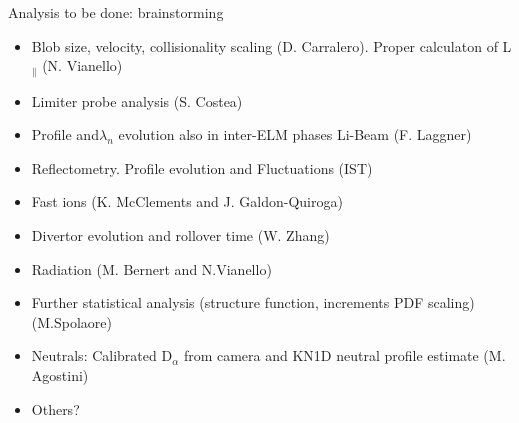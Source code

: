 \documentclass[10pt, compress]{beamer}
\begin{document}
\begin{frame}{Analysis to be done: brainstorming}
  \begin{itemize}
    \item Blob size, velocity, collisionality scaling
      (D. Carralero). Proper calculaton of L$_{\parallel}$ (N. Vianello)
    \item Limiter probe analysis (S. Costea)
    \item Profile and$\lambda_n$ evolution also in inter-ELM phases Li-Beam
      (F. Laggner)
    \item Reflectometry. Profile evolution and Fluctuations (IST)
    \item Fast ions (K. McClements and J. Galdon-Quiroga)
    \item Divertor evolution and rollover time (W. Zhang)
    \item Radiation (M. Bernert and N.Vianello)
    \item Further statistical analysis (structure function, increments
      PDF scaling) (M.Spolaore)
    \item Neutrals: Calibrated D$_{\alpha}$ from camera and KN1D
      neutral profile estimate (M. Agostini)
    \item Others?  
  \end{itemize}
\end{frame}
\end{document}
